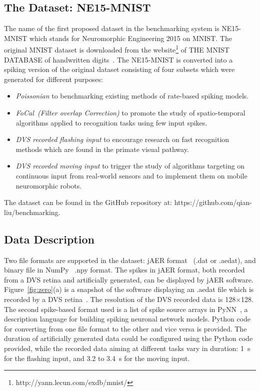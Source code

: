 \documentclass{frontiersENG} %
\begin{document}
\subsection{The Dataset: NE15-MNIST}
\label{sec:data}
The name of the first proposed dataset in the benchmarking system is NE15-MNIST which stands for Neuromorphic Engineering 2015 on MNIST.
The original MNIST dataset is downloaded from the website\footnote{http://yann.lecun.com/exdb/mnist/} of THE MNIST DATABASE of handwritten digits~\citep{lecun1998gradient}.
The NE15-MNIST is converted into a spiking version of the original dataset consisting of four subsets which were generated for different purposes:
\begin{itemize}
	\item \textit{Poissonian}
	to benchmarking existing methods of rate-based spiking models.
	\item \textit{FoCal~(Filter overlap Correction)}
	to promote the study of spatio-temporal algorithms applied to recognition tasks using few input spikes.
	\item \textit{DVS recorded flashing input}
	to encourage research on fast recognition methods which are found in the primate visual pathway.
	\item \textit{DVS recorded moving input}
	to trigger the study of algorithms targeting on continuous input from real-world sensors and to implement them on mobile neuromorphic robots.
\end{itemize}
The dataset can be found in the GitHub repository at: https://github.com/qian-liu/benchmarking.
\subsection{Data Description}

Two file formats are supported in the dataset: jAER format~\citep{delbruck2008frame} (.dat or .aedat), and binary file in NumPy~\citep{numpyPython} .npy format.
The spikes in jAER format, both recorded from a DVS retina and artificially generated, can be displayed by jAER software.
Figure~\ref{fig:zero}(a) is a snapshot of the software displaying an .aedat file which is recorded by a DVS retina~\citep{serrano2013128}.
The resolution of the DVS recorded data is 128$\times$128.
The second spike-based format used is a list of spike source arrays in PyNN~\citep{davison2008pynn}, a description language for building spiking neuronal network models.
Python code for converting from one file format to the other and vice versa is provided.
The duration of artificially generated data could be configured using the Python code provided, while the recorded data aiming at different tasks vary in duration: 1~s for the flashing input, and 3.2 to 3.4~s for the moving input.
\end{document}
